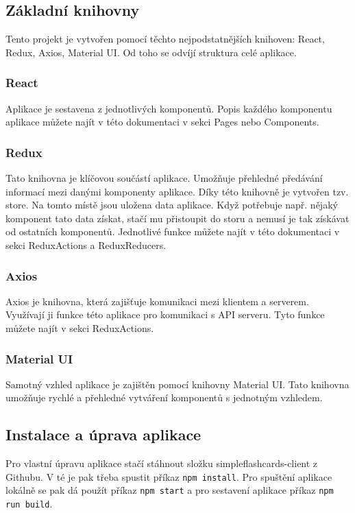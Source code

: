 \documentclass[a4paper,12pt]{article}
\begin{document}
\subsection{Základní knihovny}
Tento projekt je vytvořen pomocí těchto nejpodstatnějších knihoven: React, Redux, Axios, Material UI. Od toho se odvíjí struktura celé aplikace.

\subsubsection*{React}
Aplikace je sestavena z jednotlivých komponentů. Popis každého komponentu aplikace můžete najít v této dokumentaci v sekci Pages nebo Components.

\subsubsection*{Redux}
Tato knihovna je klíčovou součástí aplikace. Umožňuje přehledné předávání informací mezi danými komponenty aplikace. Díky této knihovně je vytvořen tzv. store. Na tomto místě jsou uložena data aplikace. Když potřebuje např. nějaký komponent tato data získat, stačí mu přistoupit do storu a nemusí je tak získávat od ostatních komponentů. Jednotlivé funkce můžete najít v této dokumentaci v sekci ReduxActions a ReduxReducers.

\subsubsection*{Axios}
Axios je knihovna, která zajišťuje komunikaci mezi klientem a serverem. Využívají ji funkce této aplikace pro komunikaci s API serveru. Tyto funkce můžete najít v sekci ReduxActions.

\subsubsection*{Material UI}
Samotný vzhled aplikace je zajištěn pomocí knihovny Material UI. Tato knihovna umožňuje rychlé a přehledné vytváření komponentů s jednotným vzhledem.

\subsection{Instalace a úprava aplikace}
Pro vlastní úpravu aplikace stačí stáhnout složku simpleflashcards-client z Githubu. V té je pak třeba spustit příkaz \verb|npm install|. Pro spuštění aplikace lokálně se pak dá použít příkaz \verb|npm start| a pro sestavení aplikace příkaz \verb|npm run build|.
\end{document}
